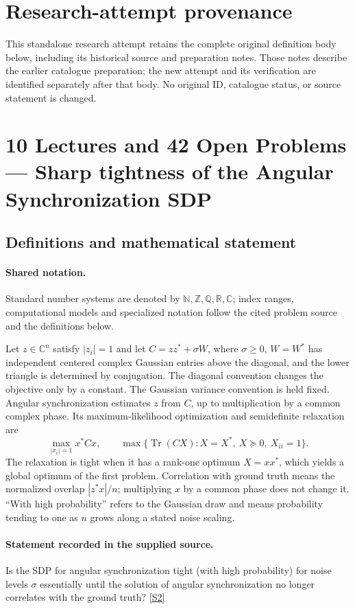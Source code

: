 \documentclass[11pt]{article}
\begin{document}
\section*{Research-attempt provenance}
This standalone research attempt retains the complete original definition body below,
including its historical source and preparation notes. Those notes describe the
earlier catalogue preparation; the new attempt and its verification are identified
separately after that body. No original ID, catalogue status, or source statement is changed.

\section{10 Lectures and 42 Open Problems — Sharp tightness of the Angular Synchronization SDP}\label{statement}

\subsection{Definitions and mathematical statement}

\paragraph{Shared notation.}Standard number systems are denoted by $\mathbb N,\mathbb Z,\mathbb Q,\mathbb R,\mathbb C$; index ranges, computational models and specialized notation follow the cited problem source and the definitions below.


Let $z\in\mathbb{C}^n$ satisfy $|z_i|=1$ and let $C=zz^*+\sigma W$, where $\sigma\ge0$, $W=W^*$ has independent centered complex Gaussian entries above the diagonal, and the lower triangle is determined by conjugation. The diagonal convention changes the objective only by a constant. The Gaussian variance convention is held fixed. Angular synchronization estimates $z$ from $C$, up to multiplication by a common complex phase. Its maximum-likelihood optimization and semidefinite relaxation are
\[
 \max_{|x_i|=1} x^*Cx,\qquad
 \max\{\operatorname{Tr}(CX):X=X^*,\ X\succeq0,\ X_{ii}=1\}.
\]
The relaxation is tight when it has a rank-one optimum $X=xx^*$, which yields a global optimum of the first problem. Correlation with ground truth means the normalized overlap $|z^*x|/n$; multiplying $x$ by a common phase does not change it. ``With high probability'' refers to the Gaussian draw and means probability tending to one as $n$ grows along a stated noise scaling.
\paragraph{Statement recorded in the supplied source.}
Is the SDP for angular synchronization tight (with high probability) for noise levels $\sigma$ essentially until the solution of angular synchronization no longer correlates with the ground truth? \href{https://afonsobandeira.wordpress.com/2015/12/09/42l10psynchronization/}{[S2]}
\end{document}
